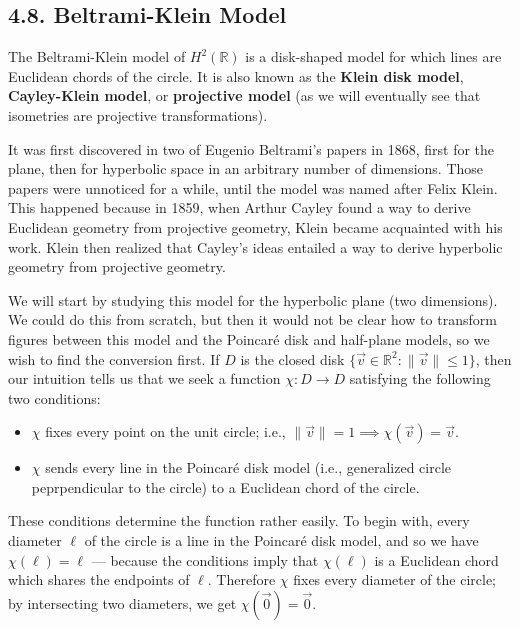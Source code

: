 \documentclass[leqno]{book}
\begin{document}
\subsection*{4.8. Beltrami-Klein Model}
The Beltrami-Klein model of $H^2(\mathbb R)$ is a disk-shaped model for which lines are Euclidean chords of the circle.  It is also known as the \textbf{Klein disk model}, \textbf{Cayley-Klein model}, or \textbf{projective model} (as we will eventually see that isometries are projective transformations).

It was first discovered in two of Eugenio Beltrami's papers in 1868, first for the plane, then for hyperbolic space in an arbitrary number of dimensions.  Those papers were unnoticed for a while, until the model was named after Felix Klein.  This happened because in 1859, when Arthur Cayley found a way to derive Euclidean geometry from projective geometry, Klein became acquainted with his work.  Klein then realized that Cayley's ideas entailed a way to derive hyperbolic geometry from projective geometry.

We will start by studying this model for the hyperbolic plane (two dimensions).  We could do this from scratch, but then it would not be clear how to transform figures between this model and the Poincar\'e disk and half-plane models, so we wish to find the conversion first.  If $D$ is the closed disk $\{\vec v\in\mathbb R^2:\|\vec v\|\leqslant 1\}$, then our intuition tells us that we seek a function $\chi:D\to D$ satisfying the following two conditions:
\begin{itemize}
\item $\chi$ fixes every point on the unit circle; i.e., $\|\vec v\|=1\implies\chi(\vec v)=\vec v$.

\item $\chi$ sends every line in the Poincar\'e disk model (i.e., generalized circle peprpendicular to the circle) to a Euclidean chord of the circle.
\end{itemize}
\noindent These conditions determine the function rather easily.  To begin with, every diameter $\ell$ of the circle is a line in the Poincar\'e disk model, and so we have $\chi(\ell)=\ell$ \---- because the conditions imply that $\chi(\ell)$ is a Euclidean chord which shares the endpoints of $\ell$.  Therefore $\chi$ fixes every diameter of the circle; by intersecting two diameters, we get $\chi(\vec 0)=\vec 0$.
\end{document}
